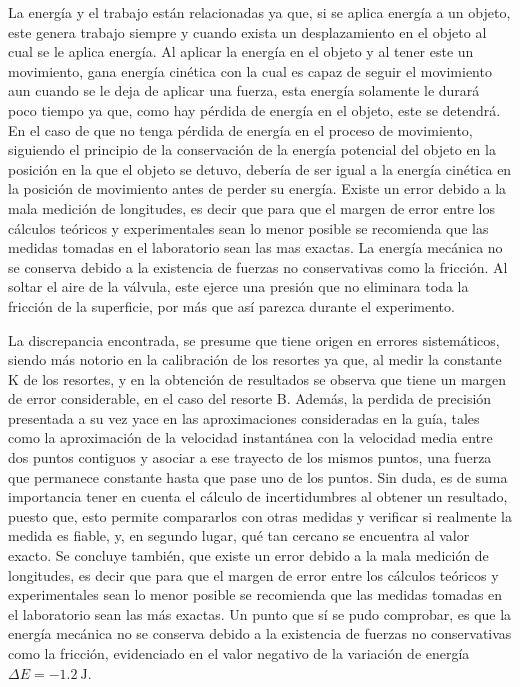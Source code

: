 \documentclass[../main.tex]{subfiles}
\begin{document}
 La energía y el trabajo están relacionadas ya que, si se aplica energía a un objeto, este genera trabajo siempre y cuando exista un desplazamiento en el objeto al cual se le aplica energía.
 Al aplicar la energía en el objeto y al tener este un movimiento, gana energía cinética con la cual es capaz de seguir el movimiento aun cuando se le deja de aplicar una fuerza, esta energía solamente le durará poco tiempo ya que, como hay pérdida de energía en el objeto, este se detendrá.
 En el caso de que no tenga pérdida de energía en el proceso de movimiento, siguiendo el principio de la conservación de la energía potencial del objeto en la posición en la que el objeto se detuvo, debería de ser igual a la energía cinética en la posición de movimiento antes de perder su energía.
 Existe un error debido a la mala medición de longitudes, es decir que para que el margen de error entre los cálculos teóricos y experimentales sean lo menor posible se recomienda que las medidas tomadas en el laboratorio sean las mas exactas.
 La energía mecánica no se conserva debido a la existencia de fuerzas no conservativas como la fricción.
 Al soltar el aire de la válvula, este ejerce una presión que no eliminara toda la fricción de la superficie, por más que así parezca durante el experimento.

La discrepancia encontrada, se presume que tiene origen en errores sistemáticos, siendo más notorio en la calibración de los resortes ya que, al medir la constante K de los resortes, y en la obtención de resultados se observa que tiene un margen de error considerable, en el caso del resorte B. Además, la perdida de precisión presentada a su vez yace en las aproximaciones consideradas en la guía, tales como la aproximación de la velocidad instantánea con la velocidad media entre dos puntos contiguos y asociar a ese trayecto de los mismos puntos, una fuerza que permanece constante hasta que pase uno de los puntos.
Sin duda, es de suma importancia tener en cuenta el cálculo de incertidumbres al obtener un resultado, puesto que, esto permite compararlos con otras medidas y verificar si realmente la medida es fiable, y, en segundo lugar, qué tan cercano se encuentra al valor exacto.
Se concluye también, que existe un error debido a la mala medición de longitudes, es decir que para que el margen de error entre los cálculos teóricos y experimentales sean lo menor posible se recomienda que las medidas tomadas en el laboratorio sean las más exactas. 
Un punto que sí se pudo comprobar, es que la energía mecánica no se conserva debido a la existencia de fuerzas no conservativas como la fricción, evidenciado en el valor negativo de la variación de energía $\Delta E = \qty{-1,2}{\joule}$.
\end{document}
